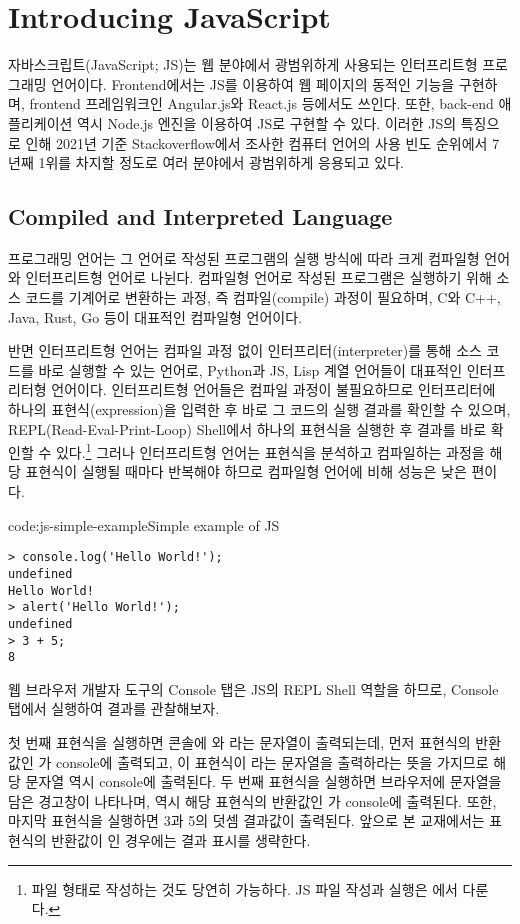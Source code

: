 \section{Introducing JavaScript}\label{sect:introducing-javascript}

자바스크립트(JavaScript; JS)는 웹 분야에서 광범위하게 사용되는 인터프리트형 프로그래밍 언어이다. Frontend에서는 JS를 이용하여 웹 페이지의 동적인 기능을 구현하며, frontend 프레임워크인 Angular.js와 React.js 등에서도 쓰인다. 또한, back-end 애플리케이션 역시 Node.js 엔진을 이용하여 JS로 구현할 수 있다. 이러한 JS의 특징으로 인해 2021년 기준 Stackoverflow에서 조사한 컴퓨터 언어의 사용 빈도 순위에서 7년째 1위를 차지할 정도로 여러 분야에서 광범위하게 응용되고 있다.

\subsection*{Compiled and Interpreted Language}

프로그래밍 언어는 그 언어로 작성된 프로그램의 실행 방식에 따라 크게 컴파일형 언어와 인터프리트형 언어로 나뉜다. 컴파일형 언어로 작성된 프로그램은 실행하기 위해 소스 코드를 기계어로 변환하는 과정, 즉 컴파일(compile) 과정이 필요하며, C와 C++, Java, Rust, Go 등이 대표적인 컴파일형 언어이다.

반면 인터프리트형 언어는 컴파일 과정 없이 인터프리터(interpreter)를 통해 소스 코드를 바로 실행할 수 있는 언어로, Python과 JS, Lisp 계열 언어들이 대표적인 인터프리터형 언어이다. 인터프리트형 언어들은 컴파일 과정이 불필요하므로 인터프리터에 하나의 표현식(expression)을 입력한 후 바로 그 코드의 실행 결과를 확인할 수 있으며, REPL(Read-Eval-Print-Loop) Shell에서 하나의 표현식을 실행한 후 결과를 바로 확인할 수 있다.\footnote{파일 형태로 작성하는 것도 당연히 가능하다. JS 파일 작성과 실행은 에서 다룬다.} 그러나 인터프리트형 언어는 표현식을 분석하고 컴파일하는 과정을 해당 표현식이 실행될 때마다 반복해야 하므로 컴파일형 언어에 비해 성능은 낮은 편이다.

\begin{codeenv}{code:js-simple-example}{Simple example of JS}\begin{verbatim}
> console.log('Hello World!');
undefined
Hello World!
> alert('Hello World!');
undefined
> 3 + 5;
8
\end{verbatim}
\end{codeenv}

웹 브라우저 개발자 도구의 Console 탭은 JS의 REPL Shell 역할을 하므로, Console 탭에서 \을 실행하여 결과를 관찰해보자.

첫 번째 표현식을 실행하면 콘솔에 와 라는 문자열이 출력되는데, 먼저 표현식의 반환값인 가 console에 출력되고, 이 표현식이 라는 문자열을 출력하라는 뜻을 가지므로 해당 문자열 역시 console에 출력된다. 두 번째 표현식을 실행하면 브라우저에  문자열을 담은 경고창이 나타나며, 역시 해당 표현식의 반환값인 가 console에 출력된다. 또한, 마지막 표현식을 실행하면 3과 5의 덧셈 결과값이 출력된다. 앞으로 본 교재에서는 표현식의 반환값이 인 경우에는 결과 표시를 생략한다.
